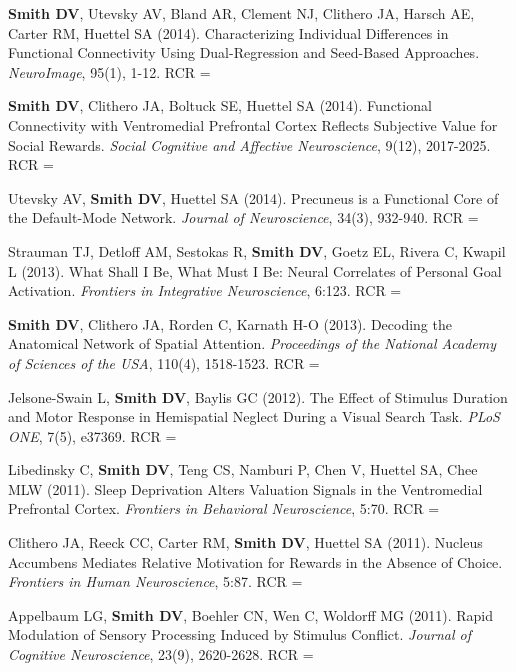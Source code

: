 \documentclass[11pt, letterpaper]{article}
\newcommand{\years}[1]{\marginnote{\scriptsize #1}}
\begin{document}
\begin{hangparas}{.5in}{1}
\years{15.}\textbf{Smith DV}, Utevsky AV, Bland AR, Clement NJ, Clithero JA, Harsch AE, Carter RM, Huettel SA (2014). Characterizing Individual Differences in Functional Connectivity Using Dual-Regression and Seed-Based Approaches. \textit{NeuroImage}, 95(1), 1-12. RCR = 

\years{14.}\textbf{Smith DV}, Clithero JA, Boltuck SE, Huettel SA (2014). Functional Connectivity with Ventromedial Prefrontal Cortex Reflects Subjective Value for Social Rewards. \textit{Social Cognitive and Affective Neuroscience}, 9(12), 2017-2025. RCR = 

\years{13.}Utevsky AV, \textbf{Smith DV}, Huettel SA (2014). Precuneus is a Functional Core of the Default-Mode Network. \textit{Journal of Neuroscience}, 34(3), 932-940. RCR = 

\years{12.}Strauman TJ, Detloff AM, Sestokas R, \textbf{Smith DV}, Goetz EL, Rivera C, Kwapil L (2013). What Shall I Be, What Must I Be: Neural Correlates of Personal Goal Activation. \textit{Frontiers in Integrative Neuroscience}, 6:123. RCR = 

\years{11.}\textbf{Smith DV}, Clithero JA, Rorden C, Karnath H-O (2013). Decoding the Anatomical Network of Spatial Attention. \textit{Proceedings of the National Academy of Sciences of the USA}, 110(4), 1518-1523. RCR = 

\years{10.}Jelsone-Swain L, \textbf{Smith DV}, Baylis GC (2012). The Effect of Stimulus Duration and Motor Response in Hemispatial Neglect During a Visual Search Task. \textit{PLoS ONE}, 7(5), e37369. RCR = 

\years{9.}Libedinsky C, \textbf{Smith DV}, Teng CS, Namburi P, Chen V, Huettel SA, Chee MLW (2011). Sleep Deprivation Alters Valuation Signals in the Ventromedial Prefrontal Cortex. \textit{Frontiers in Behavioral Neuroscience}, 5:70. RCR = 

\years{8.}Clithero JA, Reeck CC, Carter RM, \textbf{Smith DV}, Huettel SA (2011). Nucleus Accumbens Mediates Relative Motivation for Rewards in the Absence of Choice. \textit{Frontiers in Human Neuroscience}, 5:87. RCR = 

\years{7.}Appelbaum LG, \textbf{Smith DV}, Boehler CN, Wen C, Woldorff MG (2011). Rapid Modulation of Sensory Processing Induced by Stimulus Conflict. \textit{Journal of Cognitive Neuroscience}, 23(9), 2620-2628. RCR = 


\end{hangparas}
\end{document}
